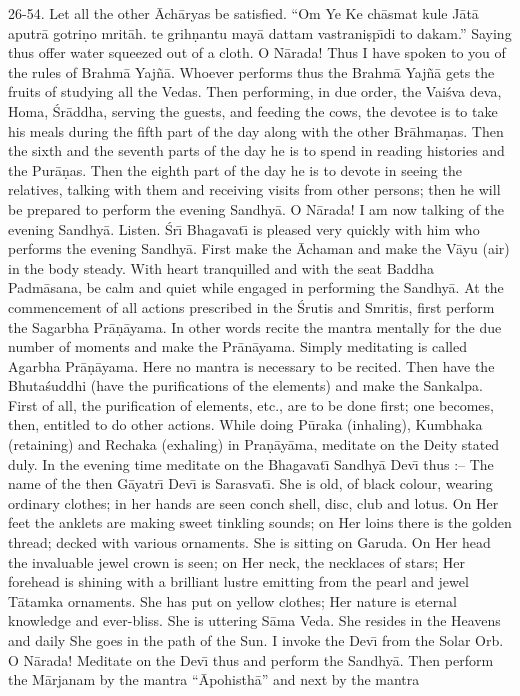 26-54. Let all the other \=Ach\=aryas be satisfied. ``Om Ye Ke ch\=asmat kule J\=at\=a aputr\=a gotri\d{n}o mrit\=ah. te grih\d{n}antu may\=a dattam vastrani\d{s}p\={\i}di to dakam.'' Saying thus offer water squeezed out of a cloth. O N\=arada! Thus I have spoken to you of the rules of Brahm\=a Yaj\~n\=a. Whoever performs thus the Brahm\=a Yaj\~n\=a gets the fruits of studying all the Vedas. Then performing, in due order, the Vai\'sva deva, Homa, \'Sr\=addha, serving the guests, and feeding the cows, the devotee is to take his meals during the fifth part of the day along with the other Br\=ahma\d{n}as. Then the sixth and the seventh parts of the day he is to spend in reading histories and the Pur\=a\d{n}as. Then the eighth part of the day he is to devote in seeing the relatives, talking with them and receiving visits from other persons; then he will be prepared to perform the evening Sandhy\=a. O N\=arada! I am now talking of the evening Sandhy\=a. Listen. \'Sr\={\i} Bhagavat\={\i} is pleased very quickly with him who performs the evening Sandhy\=a. First make the \=Achaman and make the V\=ayu (air) in the body steady. With heart tranquilled and with the seat Baddha Padm\=asana, be calm and quiet while engaged in performing the Sandhy\=a. At the commencement of all actions prescribed in the \'Srutis and Smritis, first perform the Sagarbha Pr\=a\d{n}\=ayama. In other words recite the mantra mentally for the due number of moments and make the Pr\=an\=ayama. Simply meditating is called Agarbha Pr\=a\d{n}\=ayama. Here no mantra is necessary to be recited. Then have the Bhuta\'suddhi (have the purifications of the elements) and make the Sankalpa. First of all, the purification of elements, etc., are to be done first; one becomes, then, entitled to do other actions. While doing P\=uraka (inhaling), Kumbhaka (retaining) and Rechaka (exhaling) in Pra\d{n}\=ay\=ama, meditate on the Deity stated duly. In the evening time meditate on the Bhagavat\={\i} Sandhy\=a Dev\={\i} thus :-- The name of the then G\=ayatr\={\i} Dev\={\i} is Sarasvat\={\i}. She is old, of black colour, wearing ordinary clothes; in her hands are seen conch shell, disc, club and lotus. On Her feet the anklets are making sweet tinkling sounds; on Her loins there is the golden thread; decked with various ornaments. She is sitting on Garuda. On Her head the invaluable jewel crown is seen; on Her neck, the necklaces of stars; Her forehead is shining with a brilliant lustre emitting from the pearl and jewel T\=atamka ornaments. She has put on yellow clothes; Her nature is eternal knowledge and ever-bliss. She is uttering S\=ama Veda. She resides in the Heavens and daily She goes in the path of the Sun. I invoke the Dev\={\i} from the Solar Orb. O N\=arada! Meditate on the Dev\={\i} thus and perform the Sandhy\=a. Then perform the M\=arjanam by the mantra ``\=Apohisth\=a'' and next by the mantra

